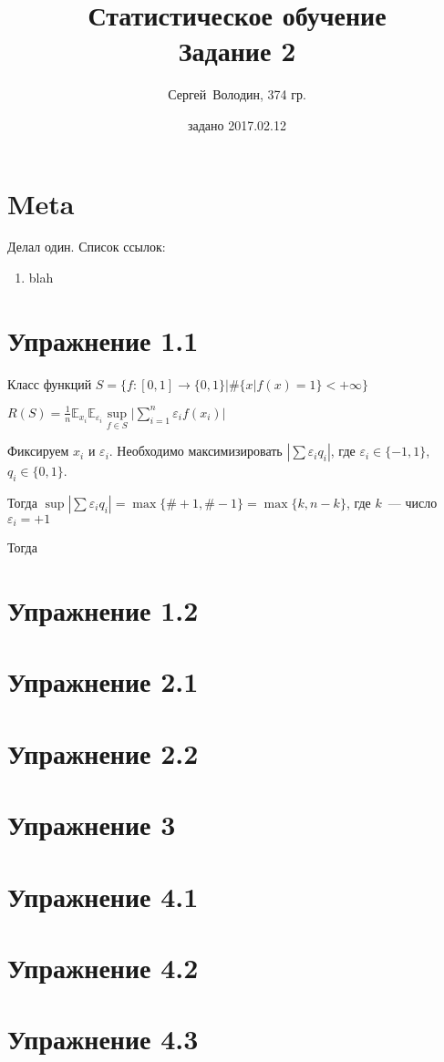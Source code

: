 \documentclass[a4paper]{article}
\title{Статистическое обучение\\Задание 2}
\date{задано 2017.02.12}
\author{Сергей~Володин, 374 гр.}
\def\eps{\varepsilon}
\begin{document}
\maketitle
\section*{Meta}
Делал один. Список ссылок:
\begin{enumerate}
\item blah
\end{enumerate}
\section*{Упражнение 1.1}
Класс функций $S=\{f\colon [0,1]\to\{0,1\}\big| \#\{x|f(x)=1\}<+\infty\}$

$R(S)=\frac{1}{n}\mathbb{E}_{x_i}\mathbb{E}_{\eps_i}\sup\limits_{f\in S}\big|\sum\limits_{i=1}^n\eps_if(x_i)\big|$

Фиксируем $x_i$ и $\eps_i$. Необходимо максимизировать $|\sum \eps_i q_i|$, где $\eps_i\in\{-1,1\}$, $q_i\in\{0,1\}$.

Тогда $\sup|\sum \eps_i q_i|=\max\{\#+1,\#-1\}=\max\{k,n-k\}$, где $k$~--- число $\eps_i=+1$

Тогда $$
\section*{Упражнение 1.2}

\section*{Упражнение 2.1}
\section*{Упражнение 2.2}
\section*{Упражнение 3}
\section*{Упражнение 4.1}
\section*{Упражнение 4.2}
\section*{Упражнение 4.3}
\end{document}
